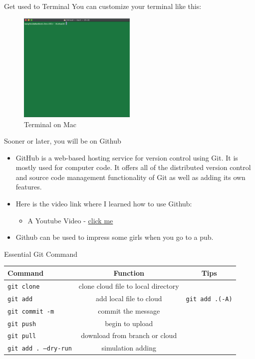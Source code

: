 \documentclass[handout]{beamer} %
\begin{document}
\begin{frame}{Get used to Terminal}
	You can customize your terminal like this:
	\begin{figure}[H]
		\centering
		\includegraphics[width = 0.5\textwidth]{Pictures/terminal2}
		\caption{Terminal on Mac}
	\end{figure}
\end{frame}

\begin{frame}{Sooner or later, you will be on Github}
\begin{itemize}
\setlength\itemsep{1em}
	\item GitHub is a web-based hosting service for version control using Git. It is mostly used for computer code. It offers all of the distributed version control and source code management functionality of Git as well as adding its own features.
	\item Here is the video link where I learned how to use Github: \begin{itemize}
	\item A Youtube Video - \href{https://www.youtube.com/watch?v=0fKg7e37bQE&fbclid=IwAR3qiy3lyLxkwiE_6recElswiRJsknhFnnhjK5M4OMNkzBbI2aco01fJBOo}{click me \Coffeecup }
	\end{itemize}
	\item Github can be used to impress some girls when you go to a pub.
\end{itemize}
\end{frame}

\begin{frame}{Essential Git Command}
\footnotesize
\begin{table}[H]
	\centering
	\begin{tabular}{lcc}
	\hline
	\hline
		Command & Function & Tips \\
		\hline
		\texttt{git clone} & clone cloud file to local directory & \\
		\texttt{git add} & add local file to cloud & \texttt{git add .(-A)} \\
		\texttt{git commit -m} & commit the message & \\
		\texttt{git push} & begin to upload & \\
		\texttt{git pull} & download from branch or cloud &\\
		\texttt{git add . --dry-run} & simulation adding & \\
		\hline
	\end{tabular}
\end{table}

\end{frame}
\end{document}
